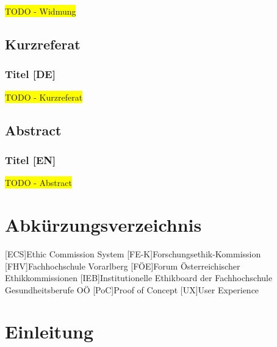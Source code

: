 \documentclass[a4paper,12pt,twoside]{scrreprt}
\begin{document}
\colorbox{yellow}{TODO - Widmung}

\newpage
\section*{Kurzreferat}
\label{sec:abstract-de}

\subsection*{Titel [DE]}

\colorbox{yellow}{TODO - Kurzreferat}

\newpage
\section*{Abstract}
\label{sec:abstract-en}

\subsection*{Titel [EN]}

\colorbox{yellow}{TODO - Abstract}

\cleardoublepage
\tableofcontents

\clearpage
{}
{}
\listoffigures

\clearpage
{}
{}
\chapter*{Abkürzungsverzeichnis}

\begin{acronym}
    [ECS]{Ethic Commission System}
    [FE-K]{Forschungsethik-Kommission}
    [FHV]{Fachhochschule Vorarlberg}
    [FÖE]{Forum Österreichischer Ethikkommissionen}
    [IEB]{Institutionelle Ethikboard der Fachhochschule Gesundheitsberufe OÖ}
    [PoC]{Proof of Concept}
    [UX]{User Experience}
\end{acronym}

\cleardoublepage
{}

\chapter{Einleitung}
\label{chap:einleitung}
\end{document}
